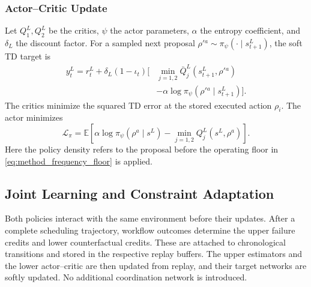 \documentclass[10pt,twocolumn]{article}
\begin{document}
\subsubsection{Actor--Critic Update}

Let $Q_1^L,Q_2^L$ be the critics, $\psi$ the actor parameters,
$\alpha$ the entropy coefficient, and $\delta_L$ the discount factor.
For a sampled next proposal $\rho'{}^a\sim\pi_\psi(\cdot\mid s_{t+1}^L)$,
the soft TD target is
\begin{align}
 y_t^L=r_t^L+\delta_L(1-\iota_t)\big[&\min_{j=1,2}
 \bar Q_j^L(s_{t+1}^L,\rho'{}^a)\nonumber\\
 &-\alpha\log\pi_\psi(\rho'{}^a\mid s_{t+1}^L)\big].
 \label{eq:method_sac_target}
\end{align}
The critics minimize the squared TD error at the stored executed
action $\rho_i$. The actor minimizes
\begin{equation}
 \mathcal L_\pi=\mathbb E\!\left[
 \alpha\log\pi_\psi(\rho^a\mid s^L)
 -\min_{j=1,2}Q_j^L(s^L,\rho^a)\right].
 \label{eq:method_sac_actor}
\end{equation}
Here the policy density refers to the proposal before the operating
floor in \eqref{eq:method_frequency_floor} is applied.

\subsection{Joint Learning and Constraint Adaptation}
\label{subsec:joint}

Both policies interact with the same environment before their updates.
After a complete scheduling trajectory, workflow outcomes determine
the upper failure credits and lower counterfactual credits. These are
attached to chronological transitions and stored in the respective
replay buffers. The upper estimators and the lower actor--critic are
then updated from replay, and their target networks are softly updated.
No additional coordination network is introduced.
\end{document}
